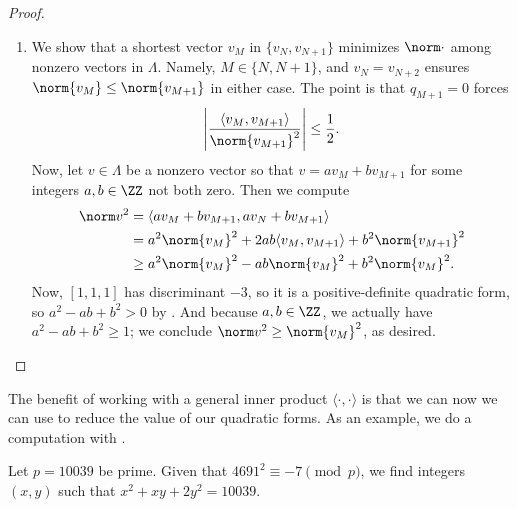 \documentclass[../notes.tex]{subfiles}
\begin{document}
\begin{proof}
\begin{enumerate}
		\item We show that a shortest vector $v_M$ in $\{v_N,v_{N+1}\}$ minimizes $\norm\cdot$ among nonzero vectors in $\Lambda$. Namely, $M\in\{N,N+1\}$, and $v_N=v_{N+2}$ ensures $\norm{v_M}\le\norm{v_{M+1}}$ in either case. The point is that $q_{M+1}=0$ forces
		\[\left|\frac{\langle v_M,v_{M+1}\rangle}{\norm{v_{M+1}}^2}\right|\le\frac12.\]
		Now, let $v\in\Lambda$ be a nonzero vector so that $v=av_M+bv_{M+1}$ for some integers $a,b\in\ZZ$ not both zero. Then we compute
		\begin{align*}
			\norm v^2 &= \langle av_M+bv_{M+1},av_N+bv_{M+1}\rangle \\
			&= a^2\norm{v_M}^2+2ab\langle v_M,v_{M+1}\rangle+b^2\norm{v_{M+1}}^2 \\
			&\ge a^2\norm{v_M}^2-ab\norm{v_M}^2+b^2\norm{v_M}^2.
		\end{align*}
		Now, $[1,1,1]$ has discriminant $-3$, so it is a positive-definite quadratic form, so $a^2-ab+b^2>0$ by . And because $a,b\in\ZZ$, we actually have $a^2-ab+b^2\ge1$; we conclude $\norm v^2\ge\norm{v_M}^2$, as desired.
		\qedhere
	\end{enumerate}
\end{proof}
The benefit of working with a general inner product $\langle\cdot,\cdot\rangle$ is that we can now we can use  to reduce the value of our quadratic forms. As an example, we do a computation with .
\begin{example}
	Let $p=10039$ be prime. Given that $4691^2\equiv-7\pmod p$, we find integers $(x,y)$ such that $x^2+xy+2y^2=10039$.
\end{example}
\end{document}
